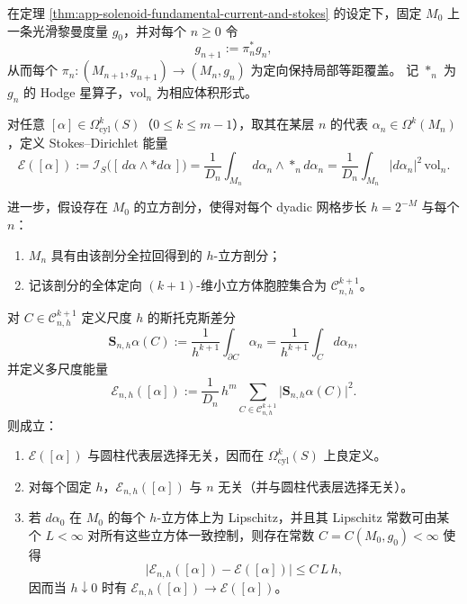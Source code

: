 
\begin{theorem}\label{thm:app-stokes-dirichlet-energy-multiscale-approx}
在定理 \ref{thm:app-solenoid-fundamental-current-and-stokes} 的设定下，固定 \(M_0\) 上一条光滑黎曼度量 \(g_0\)，并对每个 \(n\ge 0\) 令
\[
g_{n+1}:=\pi_n^\ast g_n,
\]
从而每个 \(\pi_n:(M_{n+1},g_{n+1})\to(M_n,g_n)\) 为定向保持局部等距覆盖。
记 \(*_n\) 为 \(g_n\) 的 Hodge 星算子，\(\mathrm{vol}_n\) 为相应体积形式。
\par
对任意 \([\alpha]\in\Omega^k_{\mathrm{cyl}}(S)\)（\(0\le k\le m-1\)），取其在某层 \(n\) 的代表 \(\alpha_n\in\Omega^k(M_n)\)，定义 Stokes--Dirichlet 能量
\[
\mathcal E([\alpha])
:=
\mathcal I_S\!\bigl([\,d\alpha\wedge *d\alpha\,]\bigr)
=
\frac{1}{D_n}\int_{M_n} d\alpha_n\wedge *_n d\alpha_n
=
\frac{1}{D_n}\int_{M_n}|d\alpha_n|^2\,\mathrm{vol}_n.
\]
\par
进一步，假设存在 \(M_0\) 的立方剖分，使得对每个 dyadic 网格步长 \(h=2^{-M}\) 与每个 \(n\)：
\begin{enumerate}
  \item \(M_n\) 具有由该剖分全拉回得到的 \(h\)-立方剖分；
  \item 记该剖分的全体定向 \((k+1)\)-维小立方体胞腔集合为 \(\mathcal C_{n,h}^{k+1}\)。
\end{enumerate}
对 \(C\in\mathcal C_{n,h}^{k+1}\) 定义尺度 \(h\) 的斯托克斯差分
\[
\mathbf S_{n,h}\alpha(C)
:=
\frac{1}{h^{k+1}}\int_{\partial C}\alpha_n
=
\frac{1}{h^{k+1}}\int_{C}d\alpha_n,
\]
并定义多尺度能量
\[
\mathcal E_{n,h}([\alpha])
:=
\frac{1}{D_n}\,h^{m}\sum_{C\in\mathcal C_{n,h}^{k+1}}
\bigl|\mathbf S_{n,h}\alpha(C)\bigr|^2.
\]
则成立：
\begin{enumerate}
  \item \(\mathcal E([\alpha])\) 与圆柱代表层选择无关，因而在 \(\Omega^k_{\mathrm{cyl}}(S)\) 上良定义。
  \item 对每个固定 \(h\)，\(\mathcal E_{n,h}([\alpha])\) 与 \(n\) 无关（并与圆柱代表层选择无关）。
  \item 若 \(d\alpha_0\) 在 \(M_0\) 的每个 \(h\)-立方体上为 Lipschitz，并且其 Lipschitz 常数可由某个 \(L<\infty\) 对所有这些立方体一致控制，则存在常数 \(C=C(M_0,g_0)<\infty\) 使得
  \[
  \bigl|\mathcal E_{n,h}([\alpha])-\mathcal E([\alpha])\bigr|
  \le
  C\,L\,h,
  \]
  因而当 \(h\downarrow 0\) 时有 \(\mathcal E_{n,h}([\alpha])\to\mathcal E([\alpha])\)。
\end{enumerate}
\end{theorem}

